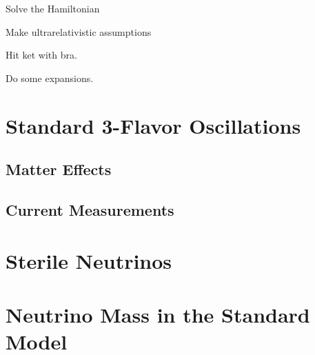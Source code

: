 Solve the Hamiltonian

Make ultrarelativistic assumptions

Hit ket with bra.

Do some expansions.

\section{Standard 3-Flavor Oscillations}
\label{sec:Theory3}

\subsection{Matter Effects}
\label{sec:TheoryMatter}

\subsection{Current Measurements}
\label{sec:BestMeasures}

\section{Sterile Neutrinos}
\label{sec:Theory3+1}

\section{Neutrino Mass in the Standard Model}
